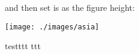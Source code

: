 \documentclass{article}
\begin{document}
\newcommand\measurepage{\dimexpr\pagegoal-\pagetotal-\baselineskip\relax}
and then set is as the figure height:



\lipsum[1-3]\bigskip
\centering

\texttt{[image: ./images/asia]}

testttt ttt\lipsum[1]
\end{document}
